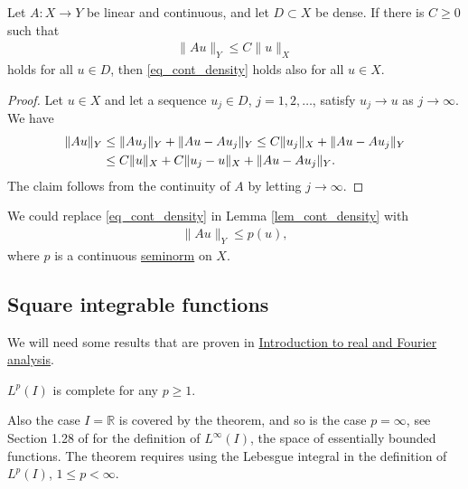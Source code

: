 \documentclass[12pt,oneside,final]{amsart}
\def\R{\mathbb R}
\begin{document}
\begin{lemma}[Closure]\label{lem_cont_density}
Let $A : X \to Y$ be linear and continuous,
and let $D \subset X$ be dense. 
If there is $C \ge 0$ such that 
    \begin{align}\label{eq_cont_density}
\|Au\|_Y \le C \|u\|_X
    \end{align}
holds for all $u \in D$, then \eqref{eq_cont_density}
holds also for all $u \in X$.
\end{lemma}
\begin{proof}
Let $u \in X$ and let a sequence $u_j \in D$, $j=1,2,\dots$, 
satisfy $u_j \to u$ as $j \to \infty$. We have 
    \begin{align}\label{eq_cont_dens_aux}
\|Au\|_Y 
&\le
 \|Au_j\|_Y + \|Au - Au_j\|_Y
\le
C \|u_j\|_X + \|Au - Au_j\|_Y
\\\notag&\le
C \|u\|_X + C\|u_j - u\|_X + \|Au - Au_j\|_Y.
    \end{align}
The claim follows from the continuity of $A$ by letting $j \to \infty$.
\end{proof}

\begin{remark}\label{rem_cont_density}
We could replace \eqref{eq_cont_density} in Lemma \ref{lem_cont_density} with
    \begin{align*}
\|Au\|_Y \le p(u),
    \end{align*}
where $p$ is a continuous \href{https://en.wikipedia.org/wiki/Seminorm}{seminorm} on $X$.
\end{remark}

\subsection{Square integrable functions}

We will need some results that are proven in \href{https://studies.helsinki.fi/opintotarjonta/cu/hy-CU-133769219-2020-08-01}{Introduction to real and Fourier analysis}.

\begin{theorem}
$L^p(I)$ is complete for any $p \ge 1$.
\end{theorem}

Also the case $I = \R$ is covered by the theorem, and so is the case $p = \infty$, see Section 1.28 of \cite{Holopainen} for the definition of $L^\infty(I)$, the space of essentially bounded functions. The theorem requires using the Lebesgue integral in the definition of $L^p(I)$, $1 \le p < \infty$. 
\end{document}
